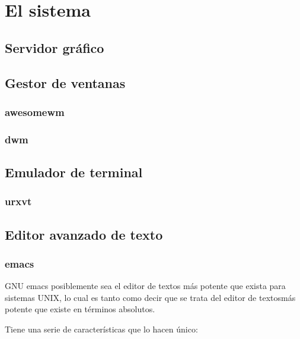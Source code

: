 \documentclass[a4paper, 11pt, titlepage]{book}
\begin{document}
    

\chapter{El sistema}

    \section{Servidor gráfico}

    \section{Gestor de ventanas}

        \subsection{awesomewm}

        \subsection{dwm}

    \section{Emulador de terminal}

        \subsection{urxvt}

    \section{Editor avanzado de texto}

        \subsection{emacs}

            GNU emacs posiblemente sea el editor de textos más potente que exista 
            para sistemas UNIX, lo cual es tanto como decir que se trata del 
            editor de textosmás potente que existe en términos absolutos.

            Tiene una serie de características que lo hacen único:
\end{document}
